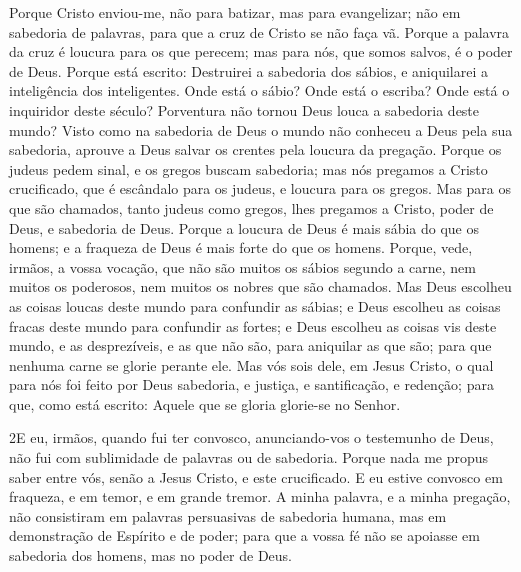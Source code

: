 Porque Cristo enviou-me, não para batizar, mas para evangelizar;
não em sabedoria de palavras, para que a cruz de Cristo se não faça
vã. Porque a palavra da cruz é loucura para os que perecem;
mas para nós, que somos salvos, é o poder de Deus. Porque
está escrito: Destruirei a sabedoria dos sábios, e aniquilarei a
inteligência dos inteligentes. Onde está o sábio? Onde está o
escriba? Onde está o inquiridor deste século? Porventura não tornou
Deus louca a sabedoria deste mundo? Visto como na sabedoria
de Deus o mundo não conheceu a Deus pela sua sabedoria, aprouve a
Deus salvar os crentes pela loucura da pregação. Porque os
judeus pedem sinal, e os gregos buscam sabedoria; mas nós
pregamos a Cristo crucificado, que é escândalo para os judeus, e
loucura para os gregos. Mas para os que são chamados, tanto
judeus como gregos, lhes pregamos a Cristo, poder de Deus, e
sabedoria de Deus. Porque a loucura de Deus é mais sábia do
que os homens; e a fraqueza de Deus é mais forte do que os homens.
Porque, vede, irmãos, a vossa vocação, que não são muitos os
sábios segundo a carne, nem muitos os poderosos, nem muitos os
nobres que são chamados. Mas Deus escolheu as coisas loucas
deste mundo para confundir as sábias; e Deus escolheu as coisas
fracas deste mundo para confundir as fortes; e Deus escolheu
as coisas vis deste mundo, e as desprezíveis, e as que não são, para
aniquilar as que são; para que nenhuma carne se glorie
perante ele. Mas vós sois dele, em Jesus Cristo, o qual para
nós foi feito por Deus sabedoria, e justiça, e santificação, e
redenção; para que, como está escrito: Aquele que se gloria
glorie-se no Senhor.

\medskip

\lettrine{2} E eu, irmãos, quando fui ter convosco,
anunciando-vos o testemunho de Deus, não fui com sublimidade de
palavras ou de sabedoria. Porque nada me propus saber entre vós,
senão a Jesus Cristo, e este crucificado. E eu estive convosco
em fraqueza, e em temor, e em grande tremor. A minha palavra, e
a minha pregação, não consistiram em palavras persuasivas de
sabedoria humana, mas em demonstração de Espírito e de poder;
para que a vossa fé não se apoiasse em sabedoria dos homens, mas
no poder de Deus.

